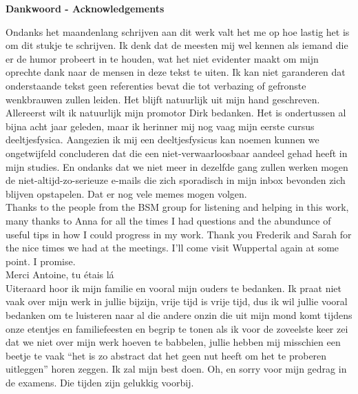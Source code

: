 \clearpage
\thispagestyle{empty}

\begin{huge}
\textbf{Dankwoord - Acknowledgements}\\
\end{huge}
\begin{large}
\newline
\newline

\noindent Ondanks het maandenlang schrijven aan dit werk valt het me op hoe lastig het is om dit stukje te schrijven. Ik denk dat de meesten mij wel kennen als iemand die er de humor probeert in te houden, wat het niet evidenter maakt om mijn oprechte dank naar de mensen in deze tekst te uiten. Ik kan niet garanderen dat onderstaande tekst geen referenties bevat die tot verbazing of gefronste wenkbrauwen zullen leiden. Het blijft natuurlijk uit mijn hand geschreven.\\

\noindent Allereerst wilt ik natuurlijk mijn promotor Dirk bedanken. Het is ondertussen al bijna acht jaar geleden, maar ik herinner mij nog vaag mijn eerste cursus deeltjesfysica. Aangezien ik mij een deeltjesfysicus kan noemen kunnen we ongetwijfeld concluderen dat die een niet-verwaarloosbaar aandeel gehad heeft in mijn studies. En ondanks dat we niet meer in dezelfde gang zullen werken mogen de niet-altijd-zo-serieuze e-mails die zich sporadisch in mijn inbox bevonden zich blijven opstapelen. Dat er nog vele memes mogen volgen.\\

\noindent Thanks to the people from the BSM group for listening and helping in this work, many thanks to Anna for all the times I had questions and the abundunce of useful tips in how I could progress in my work. Thank you Frederik and Sarah for the nice times we had at the meetings. I'll come visit Wuppertal again at some point. I promise.\\

\noindent Merci Antoine, tu \'etais l\'a \\

\noindent Uiteraard hoor ik mijn familie en vooral mijn ouders te bedanken. Ik praat niet vaak over mijn werk in jullie bijzijn, vrije tijd is vrije tijd, dus ik wil jullie vooral bedanken om te luisteren naar al die andere onzin die uit mijn mond komt tijdens onze etentjes en familiefeesten en begrip te tonen als ik voor de zoveelste keer zei dat we niet over mijn werk hoeven te babbelen, jullie hebben mij misschien een beetje te vaak ``het is zo abstract dat het geen nut heeft om het te proberen uitleggen'' horen zeggen. Ik zal mijn best doen. Oh, en sorry voor mijn gedrag in de examens. Die tijden zijn gelukkig voorbij.\\


\end{large}
